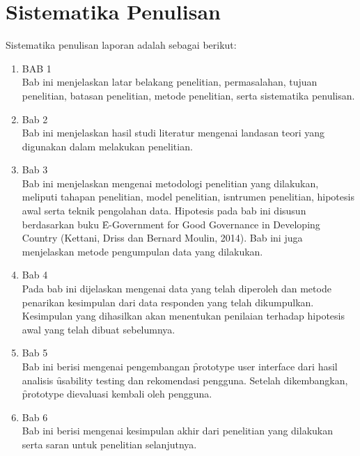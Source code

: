 \section{Sistematika Penulisan}
Sistematika penulisan laporan adalah sebagai berikut:
\begin{enumerate}
	\item BAB 1 \babSatu \\
	Bab ini menjelaskan latar belakang penelitian, permasalahan, tujuan penelitian, batasan penelitian, metode penelitian, serta sistematika penulisan. 
	\item Bab 2 \babDua \\
	Bab ini menjelaskan hasil studi literatur mengenai landasan teori yang digunakan dalam melakukan penelitian.
	\item Bab 3 \babTiga \\
	Bab ini menjelaskan mengenai metodologi penelitian yang dilakukan, meliputi tahapan penelitian, model penelitian, isntrumen penelitian, hipotesis awal serta teknik pengolahan data. Hipotesis pada bab ini disusun berdasarkan buku \f{E-Government for Good Governance in Developing Country} (Kettani, Driss dan Bernard Moulin, 2014). Bab ini juga menjelaskan metode pengumpulan data yang dilakukan.
	\item Bab 4 \babEmpat \\
	Pada bab ini dijelaskan mengenai data yang telah diperoleh dan metode penarikan kesimpulan dari data responden yang telah dikumpulkan. Kesimpulan yang dihasilkan akan menentukan penilaian terhadap hipotesis awal yang telah dibuat sebelumnya.
	\item Bab 5 \babLima \\
	Bab ini berisi mengenai pengembangan \f{prototype user interface} dari hasil analisis \f{usability testing} dan rekomendasi pengguna. Setelah dikembangkan, \f{prototype} dievaluasi kembali oleh pengguna.
	\item Bab 6 \babEnam \\
	Bab ini berisi mengenai kesimpulan akhir dari penelitian yang dilakukan serta saran untuk penelitian selanjutnya.
\end{enumerate}
